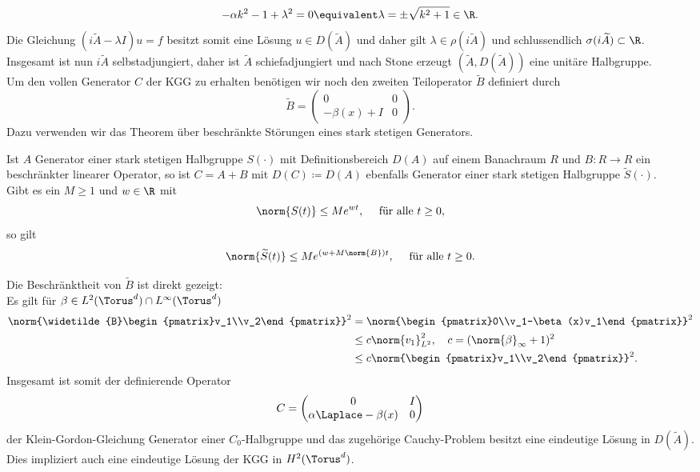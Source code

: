 \[-\alpha k^2-1+\lambda^2=0\equivalent \lambda =\pm \sqrt{k^2+1}\in\R.\]
Die Gleichung $(i\widetilde{A}-\lambda I)u=f$ besitzt somit eine Lösung $u\in D(\widetilde{A})$ und daher gilt $\lambda \in \rho(i\widetilde{A})$ und schlussendlich $\sigma(i\widetilde{A})\subset \R$.\\
Insgesamt ist nun $i\widetilde{A}$ selbstadjungiert, daher ist $\widetilde{A}$ schiefadjungiert und nach Stone erzeugt $(\widetilde{A},D(\widetilde{A}))$ eine unitäre Halbgruppe.\\[0.3cm] 
Um den vollen Generator $C$ der KGG zu erhalten benötigen wir noch den zweiten Teiloperator $\widetilde{B}$ definiert durch
\[\widetilde{B}=\begin{pmatrix}0 & 0\\-\beta(x)+I & 0\end{pmatrix}.\]
Dazu verwenden wir das Theorem über beschränkte Störungen eines stark stetigen Generators.
\begin{maththeorem}
\label{th:engelnagelbounded}
Ist $A$ Generator einer stark stetigen Halbgruppe $S(\cdot)$ mit Definitionsbereich $D(A)$ auf einem Banachraum $R$ und $B\colon R\to R$ ein beschränkter linearer Operator, so ist
$C=A+B$ mit $D(C)\coloneqq D(A)$ ebenfalls Generator einer stark stetigen Halbgruppe $\widetilde{S}(\cdot)$.\\
Gibt es ein $M\ge 1$ und $w\in\R$ mit
\[\norm{S(t)}\le Me^{wt},\quad \text{ für alle } t\ge 0,\]
so gilt
\[\norm{\widetilde{S}(t)}\le Me^{(w+M\norm{B})t},\quad \text{ für alle } t\ge 0.\]
\end{maththeorem}Die Beschränktheit von $\widetilde{B}$ ist direkt gezeigt:\\
Es gilt für $\beta\in L^2(\Torus^d)\cap L^\infty(\Torus^d)$
\begin{align*}
\norm{\widetilde{B}\begin{pmatrix}v_1\\v_2\end{pmatrix}}^2&=\norm{\begin{pmatrix}0\\v_1-\beta(x)v_1\end{pmatrix}}^2\\
&\le c\norm{v_1}_{L^2}^2, \quad c=(\norm{\beta}_{\infty}+1)^2\\
&\le c\norm{\begin{pmatrix}v_1\\v_2\end{pmatrix}}^2.
\end{align*}
Insgesamt ist somit der definierende Operator 
\[C=\begin{pmatrix}0 & I\\ \alpha\Laplace - \beta(x) & 0\end{pmatrix}\]
der Klein-Gordon-Gleichung Generator einer $C_0$-Halbgruppe und das zugehörige Cauchy-Problem besitzt eine eindeutige Lösung in $D(\widetilde{A})$. Dies impliziert auch eine eindeutige Lösung der KGG in $H^2(\Torus^d)$.
